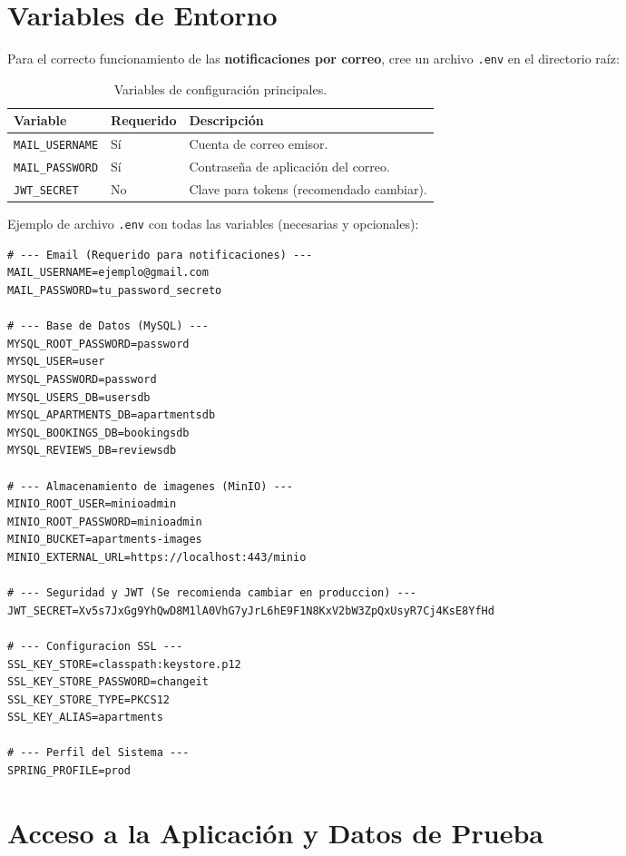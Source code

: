 \section{Variables de Entorno}
Para el correcto funcionamiento de las \textbf{notificaciones por correo}, cree un archivo \texttt{.env} en el directorio raíz:

\begin{table}[H]
\centering
\begin{tabular}{@{}lll@{}}
\toprule
\textbf{Variable} & \textbf{Requerido} & \textbf{Descripción} \\ \midrule
\texttt{MAIL\_USERNAME} & Sí & Cuenta de correo emisor. \\
\texttt{MAIL\_PASSWORD} & Sí & Contraseña de aplicación del correo. \\
\texttt{JWT\_SECRET}    & No & Clave para tokens (recomendado cambiar). \\ \bottomrule
\end{tabular}
\caption{Variables de configuración principales.}
\end{table}

Ejemplo de archivo \texttt{.env} con todas las variables (necesarias y opcionales):
\begin{lstlisting}
# --- Email (Requerido para notificaciones) ---
MAIL_USERNAME=ejemplo@gmail.com
MAIL_PASSWORD=tu_password_secreto

# --- Base de Datos (MySQL) ---
MYSQL_ROOT_PASSWORD=password
MYSQL_USER=user
MYSQL_PASSWORD=password
MYSQL_USERS_DB=usersdb
MYSQL_APARTMENTS_DB=apartmentsdb
MYSQL_BOOKINGS_DB=bookingsdb
MYSQL_REVIEWS_DB=reviewsdb

# --- Almacenamiento de imagenes (MinIO) ---
MINIO_ROOT_USER=minioadmin
MINIO_ROOT_PASSWORD=minioadmin
MINIO_BUCKET=apartments-images
MINIO_EXTERNAL_URL=https://localhost:443/minio

# --- Seguridad y JWT (Se recomienda cambiar en produccion) ---
JWT_SECRET=Xv5s7JxGg9YhQwD8M1lA0VhG7yJrL6hE9F1N8KxV2bW3ZpQxUsyR7Cj4KsE8YfHd

# --- Configuracion SSL ---
SSL_KEY_STORE=classpath:keystore.p12
SSL_KEY_STORE_PASSWORD=changeit
SSL_KEY_STORE_TYPE=PKCS12
SSL_KEY_ALIAS=apartments

# --- Perfil del Sistema ---
SPRING_PROFILE=prod
\end{lstlisting}

\section{Acceso a la Aplicación y Datos de Prueba}

